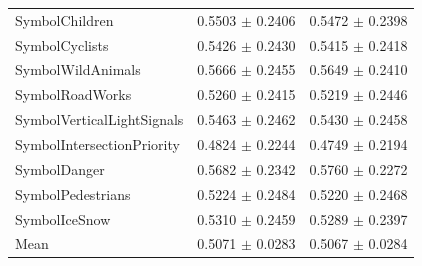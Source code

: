 \begin{longtable}{@{}lrr@{}}
SymbolChildren & 0.5503 $\pm$ 0.2406 & 0.5472 $\pm$ 0.2398 \\
SymbolCyclists & 0.5426 $\pm$ 0.2430 & 0.5415 $\pm$ 0.2418 \\
SymbolWildAnimals & 0.5666 $\pm$ 0.2455 & 0.5649 $\pm$ 0.2410 \\
SymbolRoadWorks & 0.5260 $\pm$ 0.2415 & 0.5219 $\pm$ 0.2446 \\
SymbolVerticalLightSignals & 0.5463 $\pm$ 0.2462 & 0.5430 $\pm$ 0.2458 \\
SymbolIntersectionPriority & 0.4824 $\pm$ 0.2244 & 0.4749 $\pm$ 0.2194 \\
SymbolDanger & 0.5682 $\pm$ 0.2342 & 0.5760 $\pm$ 0.2272 \\
SymbolPedestrians & 0.5224 $\pm$ 0.2484 & 0.5220 $\pm$ 0.2468 \\
SymbolIceSnow & 0.5310 $\pm$ 0.2459 & 0.5289 $\pm$ 0.2397 \\
Mean & 0.5071 $\pm$ 0.0283 & 0.5067 $\pm$ 0.0284 \\
\end{longtable}
